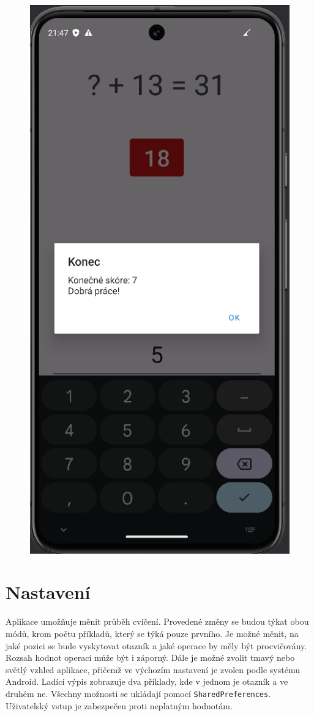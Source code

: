 \documentclass[12pt]{report}
\begin{document}
\begin{figure}[ht]
\begin{minipage}{.5\textwidth}
			\includegraphics[height=1.7\textwidth]{img/challenge_2}
			\label{fig:challenge_2}
		\end{minipage}
	\end{figure}
	
	\newpage
	\section{Nastavení}
	Aplikace umožňuje měnit průběh cvičení. Provedené změny se budou týkat obou módů, krom počtu příkladů, který se týká pouze prvního. Je možné měnit, na jaké pozici se bude vyskytovat otazník a jaké operace by měly být procvičovány. Rozsah hodnot operací může být i záporný. Dále je možné zvolit tmavý nebo světlý vzhled aplikace, přičemž ve výchozím nastavení je zvolen podle systému Android. Ladící výpis zobrazuje dva příklady, kde v jednom je otazník a ve druhém ne. Všechny možnosti se ukládají pomocí \texttt{SharedPreferences}. Uživatelský vstup je zabezpečen proti neplatným hodnotám.
	
\end{document}
